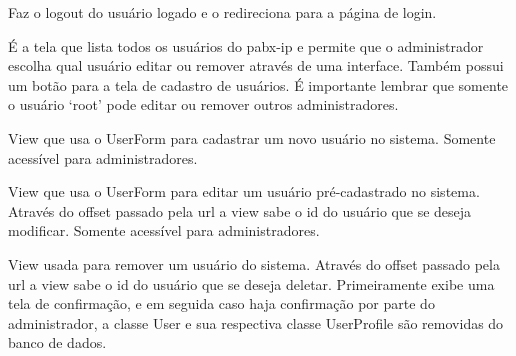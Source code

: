 \documentclass[letterpaper,10pt,brazil]{sphinxmanual}
\begin{document}

\begin{fulllineitems}
\label{apps/accounts:accounts.views.logout}
Faz o logout do usuário logado e o redireciona para a página de login.

\end{fulllineitems}


\begin{fulllineitems}
\label{apps/accounts:accounts.views.settings}
É a tela que lista todos os usuários do pabx-ip e permite que o administrador escolha qual usuário editar ou remover através de uma interface. Também possui um botão para a tela de cadastro de usuários. É importante lembrar que somente o usuário `root' pode editar ou remover outros administradores.

\end{fulllineitems}


\begin{fulllineitems}
\label{apps/accounts:accounts.views.create}
View que usa o UserForm para cadastrar um novo usuário no sistema. Somente acessível para administradores.

\end{fulllineitems}


\begin{fulllineitems}
\label{apps/accounts:accounts.views.edit}
View que usa o UserForm para editar um usuário pré-cadastrado no sistema. Através do offset passado pela url a view sabe o id do usuário que se deseja modificar. Somente acessível para administradores.

\end{fulllineitems}


\begin{fulllineitems}
\label{apps/accounts:accounts.views.delete}
View usada para remover um usuário do sistema. Através do offset passado pela url a view sabe o id do usuário que se deseja deletar. Primeiramente exibe uma tela de confirmação, e em seguida caso haja confirmação por parte do administrador, a classe User e sua respectiva classe UserProfile são removidas do banco de dados.

\end{fulllineitems}
\end{document}
